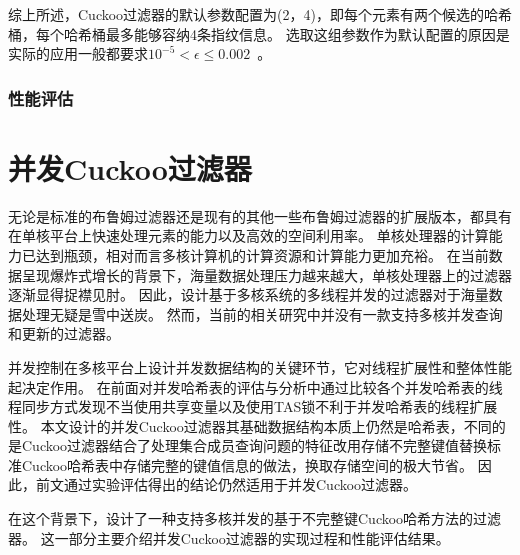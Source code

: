 综上所述，Cuckoo过滤器的默认参数配置为(2，4)，即每个元素有两个候选的哈希桶，每个哈希桶最多能够容纳4条指纹信息。
选取这组参数作为默认配置的原因是实际的应用一般都要求$ 10^{-5} < \epsilon \leq 0.002$~\cite{broder2004network}。

\subsubsection{性能评估}

\section{并发Cuckoo过滤器}
无论是标准的布鲁姆过滤器还是现有的其他一些布鲁姆过滤器的扩展版本，都具有在单核平台上快速处理元素的能力以及高效的空间利用率。
单核处理器的计算能力已达到瓶颈，相对而言多核计算机的计算资源和计算能力更加充裕。
在当前数据呈现爆炸式增长的背景下，海量数据处理压力越来越大，单核处理器上的过滤器逐渐显得捉襟见肘。
因此，设计基于多核系统的多线程并发的过滤器对于海量数据处理无疑是雪中送炭。
然而，当前的相关研究中并没有一款支持多核并发查询和更新的过滤器。

并发控制在多核平台上设计并发数据结构的关键环节，它对线程扩展性和整体性能起决定作用。
在前面对并发哈希表的评估与分析中通过比较各个并发哈希表的线程同步方式发现不当使用共享变量以及使用TAS锁不利于并发哈希表的线程扩展性。
本文设计的并发Cuckoo过滤器其基础数据结构本质上仍然是哈希表，不同的是Cuckoo过滤器结合了处理集合成员查询问题的特征改用存储不完整键值替换标准Cuckoo哈希表中存储完整的键值信息的做法，换取存储空间的极大节省。
因此，前文通过实验评估得出的结论仍然适用于并发Cuckoo过滤器。

在这个背景下，设计了一种支持多核并发的基于不完整键Cuckoo哈希方法的过滤器。
这一部分主要介绍并发Cuckoo过滤器的实现过程和性能评估结果。

